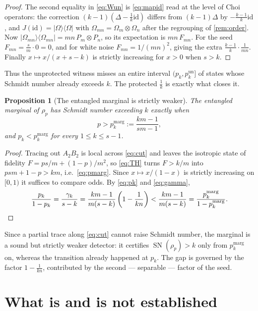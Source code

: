 \documentclass[11pt,reqno]{amsart}
\theoremstyle{plain}
\newtheorem{proposition}[theorem]{Proposition}
\theoremstyle{remark}
\DeclareMathOperator{\SN}{SN}
\newcommand{\id}{\mathrm{id}}
\newcommand{\ketbra}[2]{\lvert #1\rangle\!\langle #2\rvert}
\begin{document}
\begin{proof}
The second equality in \cref{eq:Wun} is \cref{eq:mapid} read at the level of
Choi operators: the correction $(k-1)(\Delta-\frac1k\id)$ differs from
$(k-1)\Delta$ by $-\frac{k-1}k\id$, and $J(\id)=\ketbra\Omega\Omega$ with
$\Omega_{mn}=\Omega_m\otimes\Omega_n$ after the regrouping of \cref{rem:order}.
Now $\ketbra{\Omega_{mn}}{\Omega_{mn}}=mn\,P_m\otimes P_n$, so its expectation
is $mn\,F_{mn}$.  For the seed $F_{mn}=\frac sm\cdot0=0$, and for white noise
$F_{mn}=1/(mn)^2$, giving the extra $\frac{k-1}k\cdot\frac1{mn}$.  Finally
$x\mapsto x/(x+s-k)$ is strictly increasing for $x>0$ when $s>k$.
\end{proof}

Thus the unprotected witness misses an entire interval
$(p_k,p_k^{\mathrm{un}}]$ of states whose Schmidt number already exceeds $k$.
The protected $\frac1k$ is exactly what closes it.

\begin{proposition}[The entangled marginal is strictly weaker]
\label{prop:marginal}
The entangled marginal of $\rho_p$ has Schmidt number exceeding $k$ exactly
when
\begin{equation}
\label{eq:pmarg}
    p>p_k^{\mathrm{marg}}:=\frac{km-1}{sm-1},
\end{equation}
and $p_k<p_k^{\mathrm{marg}}$ for every $1\le k\le s-1$.
\end{proposition}

\begin{proof}
Tracing out $A_2B_2$ is local across \cref{eq:cut} and leaves the isotropic
state of fidelity $F=ps/m+(1-p)/m^2$, so \cref{eq:TH} turns $F>k/m$ into
$psm+1-p>km$, i.e.\ \cref{eq:pmarg}.  Since
$x\mapsto x/(1-x)$ is strictly increasing on $[0,1)$ it suffices to compare
odds.  By \cref{eq:pk} and \cref{eq:gamma},
\[
    \frac{p_k}{1-p_k}
    =\frac{\gamma_k}{s-k}
    =\frac{km-1}{m(s-k)}\left(1-\frac1{kn}\right)
    <\frac{km-1}{m(s-k)}
    =\frac{p_k^{\mathrm{marg}}}{1-p_k^{\mathrm{marg}}} . \qedhere
\]
\end{proof}

Since a partial trace along \cref{eq:cut} cannot raise Schmidt number, the
marginal is a sound but strictly weaker detector: it certifies $\SN(\rho_p)>k$
only from $p_k^{\mathrm{marg}}$ on, whereas the transition already happened at
$p_k$.  The gap is governed by the factor $1-\frac1{kn}$, contributed by the
second --- separable --- factor of the seed.

\section*{What is and is not established}
\end{document}
